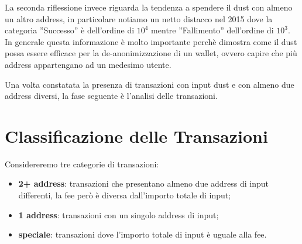 La seconda riflessione invece riguarda la tendenza a spendere il dust con almeno un altro address, in particolare notiamo un netto distacco nel 2015 dove la categoria ”Successo” è dell’ordine di $10^4$ mentre ”Fallimento” dell’ordine di $10^3$. In generale questa informazione è molto importante perchè dimostra come il dust possa essere efficace per la de-anonimizzazione di un wallet, ovvero capire che più address appartengano ad un medesimo utente.

Una volta constatata la presenza di transazioni con input dust e con almeno due address diversi, la fase seguente è l'analisi delle transazioni. 
\section{Classificazione delle Transazioni}
Considereremo tre categorie di transazioni: 
\begin{itemize}
    \item \textbf{2+ address}: transazioni che presentano almeno due address di input differenti, la fee però è diversa dall'importo totale di input;
    \item \textbf{1 address}: transazioni con un singolo address di input;
    \item \textbf{speciale}: transazioni dove l'importo totale di input è uguale alla fee.
\end{itemize}

